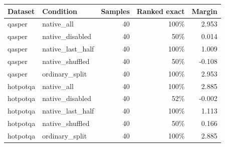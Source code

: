 \begin{tabular}{llrrr}
\toprule
Dataset & Condition & Samples & Ranked exact & Margin \\
\midrule
qasper & native\_all & 40 & 100\% & 2.953 \\
qasper & native\_disabled & 40 & 50\% & 0.014 \\
qasper & native\_last\_half & 40 & 100\% & 1.009 \\
qasper & native\_shuffled & 40 & 50\% & -0.108 \\
qasper & ordinary\_split & 40 & 100\% & 2.953 \\
hotpotqa & native\_all & 40 & 100\% & 2.885 \\
hotpotqa & native\_disabled & 40 & 52\% & -0.002 \\
hotpotqa & native\_last\_half & 40 & 100\% & 1.113 \\
hotpotqa & native\_shuffled & 40 & 50\% & 0.166 \\
hotpotqa & ordinary\_split & 40 & 100\% & 2.885 \\
\bottomrule
\end{tabular}
